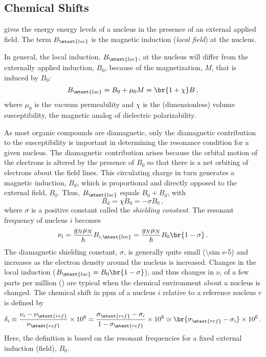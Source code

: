 \documentclass[nobib,nofonts,nols,nohyper]{tufte-handout}
\begin{document}

\subsection{Chemical Shifts} %
\label{sub:chemical_shifts}

 gives the energy energy levels of a nucleus in the presence of an external applied field. 
The term \( B_\mtext{loc} \) is the magnetic induction (\emph{local field}) at the nucleus. 

In general, the local induction, \( B_\mtext{loc} \), at the nucleus will differ from the externally applied induction, \( B_0 \), because of the magnetization, \( M \), that is induced by \( B_0 \):
\begin{equation}
	B_\mtext{loc} = B_0 + \mu_0 M = \br{1 + \chi} B \, ,
	\label{eq:b_loc}
\end{equation}
where \( \mu_0 \) is the vacuum permeability and \( \chi \) is the (dimensionless) volume susceptibility, the magnetic analog of dielectric polarizability. 

As most organic compounds are diamagnetic, only the diamagnetic contribution to the susceptibility is important in determining the resonance condition for a given nucleus. 
The diamagnetic contribution arises because the orbital motion of the electrons is altered by the presence of \( B_0 \) so that there is a net orbiting of electrons about the field lines. 
This circulating charge in turn generates a magnetic induction, \( B_d \), which is proportional and directly opposed to the external field, \( B_0 \). 
Thus, \( B_\mtext{loc} \) equals \( B_0 + B_d \), with
\begin{equation}
	B_d = \chi B_0 = -\sigma B_0 \, ,
	\label{eq:B_dia}
\end{equation}
where \( \sigma \) is a positive constant called the \emph{shielding constant}. 
The resonant frequency of nucleus \( i \) becomes 
\begin{equation}
	\nu_i = \frac{g_N \mu_N}{h} B_{i, \mtext{loc}} = \frac{g_N \mu_N}{h} B_0 \br{1 - \sigma} \, .
	\label{eq:chem_shift}
\end{equation} 
The diamagnetic shielding constant, \( \sigma \), is generally quite small (\num{\sim e-5}) and increases as the electron density around the nucleus is increased. 
Changes in the local induction (\( B_\mtext{loc} = B_0 \br{1 - \sigma} \)), and thus changes in \( \nu \), of a few parts per million (\unit{\ppm}) are typical when the chemical environment about a nucleus is changed. 
The chemical shift in \unit{ppm} of a nucleus \( i \) relative to a reference nucleus \( r \) is defined by 
\begin{equation}
	\delta_{i} \equiv 
		\frac{\nu_{i}-\nu_\mtext{ref}}{\nu_\mtext{ref}} \times 10^6 = 
		\frac{\sigma_\mtext{ref} - \sigma_i}{1 - \sigma_\mtext{ref}} \times 10^6 \simeq 
		\br{\sigma_\mtext{ref} - \sigma_i} \times 10^6 \, .
		\label{eq:chem_shift_delta}
\end{equation}
Here, the definition is based on the resonant frequencies for a fixed external induction (field), \( B_0 \). 
\end{document}
